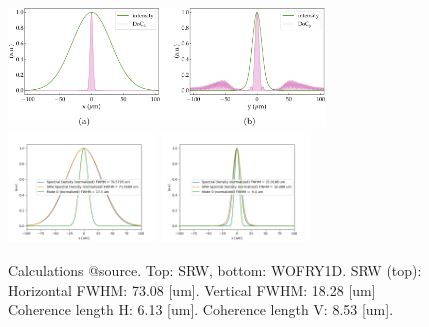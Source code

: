 \documentclass{iucr}              %
\begin{document}
\newpage
\onecolumn
\begin{figure}
    \label{fig:CSD_SRW_vs_I_source}
    \includegraphics[width=0.75\textwidth]{CSD_SRW_vs_I_source.pdf}
    \includegraphics[width=0.35\textwidth]{figures/CSD_WOFRY1D_vs_I_source_h.png}
    \includegraphics[width=0.35\textwidth]{figures/CSD_WOFRY1D_vs_I_source_v.png}
    \caption{Calculations @source. Top: SRW, bottom: WOFRY1D.
SRW (top): Horizontal FWHM: 73.08 [um]. 
Vertical FWHM: 18.28 [um]
Coherence length H: 6.13 [um]. 
Coherence length V: 8.53 [um].
    }
\end{figure}
\end{document}
